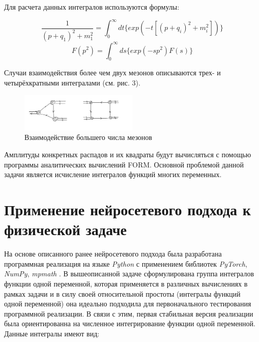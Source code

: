 \documentclass[a4paper,12pt]{article} %
\renewcommand{\figurename}{Рисунок\_}
\begin{document}
Для расчета данных интегралов используются формулы:

\begin{equation}
    \frac{1}{(p + q_1)^2 + m_1^2} = \int_{0}^{\infty}dt\{exp(-t[(p + q_i)^2 + m_i^2])\} 
\end{equation}
\begin{equation}
    F(p^2) = \int_{0}^{\infty}ds\{exp(-sp^2)F(s)\} 
\end{equation}

Случаи взаимодействия более чем двух мезонов описываются трех- и четырёхкратными интегралами (см. рис. 3).

\renewcommand{\figurename}{Рисунок}
\renewcommand{\thefigure}{3}
\begin{figure}[H]
    \centering
    \includegraphics[width=0.5\textwidth]{multiple-interactions.png}
    \caption{Взаимодействие большего числа мезонов}

\end{figure}

Амплитуды конкретных распадов и их квадраты будут вычисляться с помощью программы аналитических вычислений FORM. Основной проблемой данной задачи является исчисление интегралов функций многих переменных.

\section{Применение нейросетевого подхода к физической задаче}

На основе описанного ранее нейросетевого подхода была разработана программная реализация на языке \textit{Python} с применением библиотек \textit{PyTorch}, \textit{NumPy}, \textit{mpmath} \cite{python}\cite{pytorch}\cite{numpy}\cite{mpmath}. В вышеописанной задаче сформулирована группа интегралов функции одной переменной, которая применяется в различных вычислениях в рамках задачи и в силу своей относительной простоты (интегралы функций одной переменной) она идеально подходила для первоначального тестирования программной реализации. В связи с этим, первая стабильная версия реализации была ориентированна на численное интегрирование функции одной переменной. Данные интегралы имеют вид:
\end{document}
